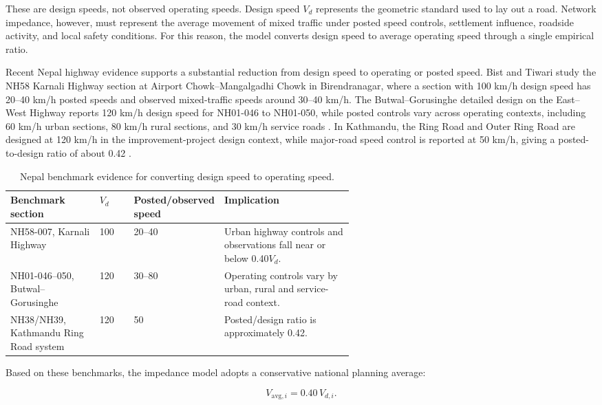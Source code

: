 \documentclass[11pt,a4paper]{article}
\begin{document}
These are design speeds, not observed operating speeds. Design speed $V_d$
represents the geometric standard used to lay out a road. Network impedance,
however, must represent the average movement of mixed traffic under posted
speed controls, settlement influence, roadside activity, and local safety
conditions. For this reason, the model converts design speed to average
operating speed through a single empirical ratio.

Recent Nepal highway evidence supports a substantial reduction from design
speed to operating or posted speed. Bist and Tiwari \cite{bist2024} study the
NH58 Karnali Highway section at Airport Chowk--Mangalgadhi Chowk in
Birendranagar, where a section with 100 km/h design speed has 20--40 km/h
posted speeds and observed mixed-traffic speeds around 30--40 km/h. The
Butwal--Gorusinghe detailed design on the East--West Highway reports 120 km/h
design speed for NH01-046 to NH01-050, while posted controls vary across
operating contexts, including 60 km/h urban sections, 80 km/h rural sections,
and 30 km/h service roads \cite{dor2023}. In Kathmandu, the Ring Road and Outer
Ring Road are designed at 120 km/h in the improvement-project design context,
while major-road speed control is reported at 50 km/h, giving a posted-to-design
ratio of about 0.42 \cite{jica2022,ktmtraffic2023}.

\begin{table}[H]
\centering
\caption{Nepal benchmark evidence for converting design speed to operating speed.}
\small
\begin{tabularx}{\linewidth}{L{0.26\linewidth} L{0.10\linewidth} L{0.22\linewidth} Y}
\toprule
\textbf{Benchmark section} & \textbf{$V_d$} & \textbf{Posted/observed speed} &
\textbf{Implication} \\
\midrule
NH58-007, Karnali Highway & 100 & 20--40 &
Urban highway controls and observations fall near or below 0.40$V_d$. \\
NH01-046--050, Butwal--Gorusinghe & 120 & 30--80 &
Operating controls vary by urban, rural and service-road context. \\
NH38/NH39, Kathmandu Ring Road system & 120 & 50 &
Posted/design ratio is approximately 0.42. \\
\bottomrule
\end{tabularx}
\end{table}

Based on these benchmarks, the impedance model adopts a conservative national
planning average:

\begin{equation}
V_{\text{avg},i}=0.40\,V_{d,i}.
\label{eq:mean-speed}
\end{equation}
\end{document}

